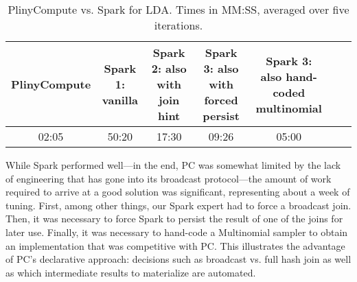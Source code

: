 \begin{table}[h!]
\begin{center}
\begin{tabular}{|c||c|c|c|c|c|c|}
\hline
PlinyCompute & \makecell{Spark 1: \\vanilla} & \makecell{Spark 2: also with \\join hint} & \makecell{Spark 3: also with \\forced persist} & \makecell{Spark 3: also hand-\\coded multinomial} \\
\hline
02:05 & 50:20 & 17:30 & 09:26 & 05:00 \\
\hline
\end{tabular}
\caption{PlinyCompute vs. Spark for LDA. Times in MM:SS, averaged over five iterations.}
\label{fig:LDA}
\end{center}
\end{table}


While Spark performed well---in the end, PC was somewhat
limited by the lack of engineering that has gone
into its broadcast protocol---the 
amount of work required to arrive at a good solution 
was significant, representing about a week of tuning.  First, among other things, our Spark expert had to force a 
broadcast join.  Then, it was necessary to force Spark to
persist the result of one of the joins for later use.  Finally, it was necessary to hand-code a 
Multinomial sampler to obtain an implementation that was competitive with PC.
This illustrates the advantage of PC's declarative approach: decisions such as broadcast vs. full hash
join as well as which intermediate results to materialize are automated.  


